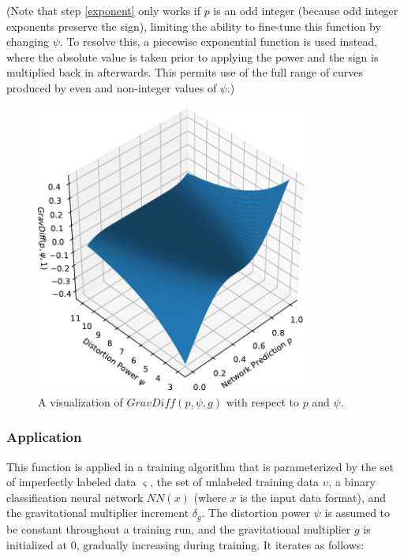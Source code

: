 \documentclass[10pt]{article}
\begin{document}
(Note that step \ref{exponent} only works if $p$ is an odd integer (because odd integer exponents preserve the sign), limiting the ability to fine-tune this function by changing $\psi$. To resolve this, a piecewise exponential function is used instead, where the absolute value is taken prior to applying the power and the sign is multiplied back in afterwards. This permits use of the full range of curves produced by even and non-integer values of $\psi$.)

\begin{figure}[H]
    \centering
    \includegraphics[width=0.8\textwidth]{grav_diff}
    \caption{\label{grav_diff} A visualization of $GravDiff(p, \psi, g)$ with respect to $p$ and $\psi$.}
\end{figure}

\subsubsection{Application}

This function is applied in a training algorithm that is parameterized by the set of imperfectly labeled data $\varsigma$, the set of unlabeled training data $\upsilon$, a binary classification neural network $NN(x)$ (where $x$ is the input data format), and the gravitational multiplier increment $\delta_g$. The distortion power $\psi$ is assumed to be constant throughout a training run, and the gravitational multiplier $g$ is initialized at 0, gradually increasing during training. It iterates as follows:
\end{document}
